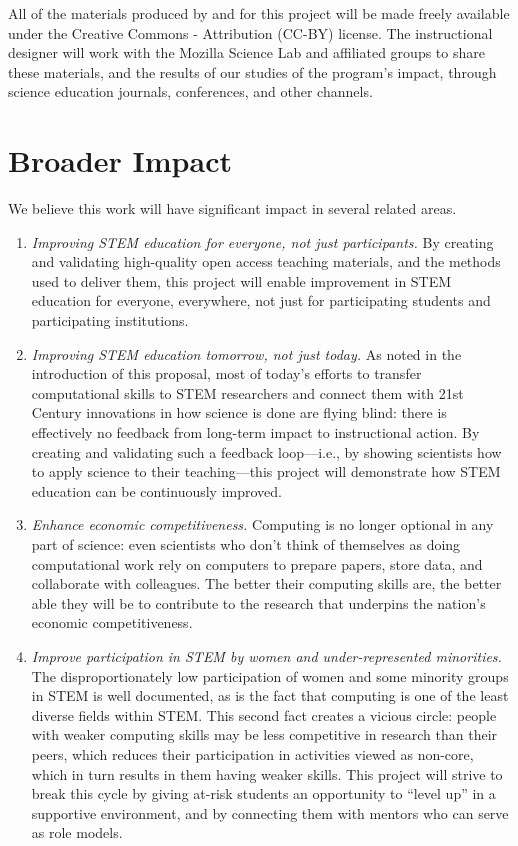 \documentclass[11pt]{article}
\begin{document}
All of the materials produced by and for this project will be made
freely available under the Creative Commons - Attribution (CC-BY)
license.  The instructional designer will work with the Mozilla
Science Lab and affiliated groups to share these materials, and the
results of our studies of the program's impact, through science
education journals, conferences, and other channels.

\section{Broader Impact}

We believe this work will have significant impact in several related
areas.

\begin{enumerate}

\item
  \emph{Improving STEM education for everyone, not just participants.}
  By creating and validating high-quality open access teaching
  materials, and the methods used to deliver them, this project will
  enable improvement in STEM education for everyone, everywhere, not
  just for participating students and participating institutions.

\item
  \emph{Improving STEM education tomorrow, not just today.}  As noted
  in the introduction of this proposal, most of today's efforts to
  transfer computational skills to STEM researchers and connect them
  with 21st Century innovations in how science is done are flying
  blind: there is effectively no feedback from long-term impact to
  instructional action.  By creating and validating such a feedback
  loop---i.e., by showing scientists how to apply science to their
  teaching---this project will demonstrate how STEM education can be
  continuously improved.

\item
  \emph{Enhance economic competitiveness.} Computing is no longer
  optional in any part of science: even scientists who don't think of
  themselves as doing computational work rely on computers to prepare
  papers, store data, and collaborate with colleagues.  The better
  their computing skills are, the better able they will be to
  contribute to the research that underpins the nation's economic
  competitiveness.

\item
  \emph{Improve participation in STEM by women and under-represented
    minorities.} The disproportionately low participation of women and
  some minority groups in STEM is well documented, as is the fact that
  computing is one of the least diverse fields within STEM.  This
  second fact creates a vicious circle: people with weaker computing
  skills may be less competitive in research than their peers, which
  reduces their participation in activities viewed as non-core, which
  in turn results in them having weaker skills.  This project will
  strive to break this cycle by giving at-risk students an opportunity
  to ``level up'' in a supportive environment, and by connecting them
  with mentors who can serve as role models.

\end{enumerate}
\end{document}
